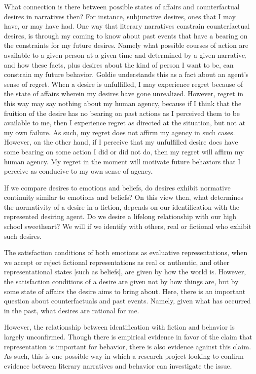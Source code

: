 \documentclass[12pt]{book}
\theoremstyle{definition}
\theoremstyle{remark}
\begin{document}
What connection is there between possible states of affairs and counterfactual desires in narratives then? For instance, subjunctive desires, ones that I may have, or may have had. One way that literary narratives constrain counterfactual desires, is through my coming to know about past events that have a bearing on the constraints for my future desires. Namely what possible courses of action are available to a given person at a given time and determined by a given narrative, and how these facts, plus desires about the kind of person I want to be, can constrain my future behavior. Goldie understands this as a fact about an agent's sense of regret. When a desire is unfulfilled, I may experience regret because of the state of affairs wherein my desires have gone unrealized. However, regret in this way may say nothing about my human agency, because if I think that the fruition of the desire has no bearing on past actions as I perceived them to be available to me, then I experience regret as directed at the situation, but not at my own failure. As such, my regret does not affirm my agency in such cases. However, on the other hand, if I perceive that my unfulfilled desire does have some bearing on some action I did or did not do, then my regret will affirm my human agency. My regret in the moment will motivate future behaviors that I perceive as conducive to my own sense of agency.

If we compare desires to emotions and beliefs, do desires exhibit normative continuity similar to emotions and beliefs? On this view then, what determines the normativity of a desire in a fiction, depends on our identification with the represented desiring agent. Do we desire a lifelong relationship with our high school sweetheart? We will if we identify with others, real or fictional who exhibit such desires.

The satisfaction conditions of both emotions as evaluative representations, when we accept or reject fictional representations as real or authentic, and other representational states {[}such as beliefs{]}, are given by how the world is. However, the satisfaction conditions of a desire are given not by how things are, but by some state of affairs the desire aims to bring about. Here, there is an important question about counterfactuals and past events. Namely, given what has occurred in the past, what desires are rational for me.

However, the relationship between identification with fiction and behavior is largely unconfirmed. Though there is empirical evidence in favor of the claim that representation is important for behavior, there is also evidence against this claim. As such, this is one possible way in which a research project looking to confirm evidence between literary narratives and behavior can investigate the issue.
\end{document}
